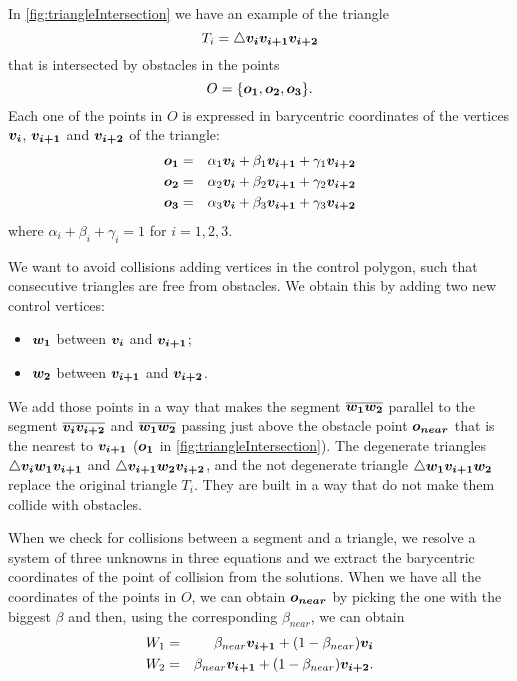 \documentclass[dissertation.tex]{subfiles}
\begin{document}
In \cref{fig:triangleIntersection} we have an example of the triangle
\begin{equation*}
  T_i = \triangle \boldsymbol{v_i}\boldsymbol{v_{i+1}}\boldsymbol{v_{i+2}} 
\end{equation*}
that is
intersected by obstacles in the points
\begin{equation*}
  O = \{\boldsymbol{o_1},\boldsymbol{o_2},\boldsymbol{o_3}\}.
\end{equation*}
Each one of the points in $O$ is expressed in barycentric
coordinates of the vertices $\boldsymbol{v_i}$, $\boldsymbol{v_{i+1}}$ and $\boldsymbol{v_{i+2}}$ of the
triangle:
\begin{eqnarray*}
  \boldsymbol{o_1}&=&\alpha_1 \boldsymbol{v_i}+\beta_1 \boldsymbol{v_{i+1}}+\gamma_1 \boldsymbol{v_{i+2}}\\
  \boldsymbol{o_2}&=&\alpha_2 \boldsymbol{v_i}+\beta_2 \boldsymbol{v_{i+1}}+\gamma_2 \boldsymbol{v_{i+2}}\\
  \boldsymbol{o_3}&=&\alpha_3 \boldsymbol{v_i}+\beta_3 \boldsymbol{v_{i+1}}+\gamma_3 \boldsymbol{v_{i+2}}
\end{eqnarray*}
where $\alpha_i+\beta_i+\gamma_i=1$ for $i=1,2,3$.

We want to avoid collisions adding vertices in the control
polygon, such that consecutive triangles are free from obstacles. We
obtain this by adding two new control vertices: 
\begin{itemize}
\item $\boldsymbol{w_1}$ between $\boldsymbol{v_i}$ and $\boldsymbol{v_{i+1}}$;
\item $\boldsymbol{w_2}$ between $\boldsymbol{v_{i+1}}$ and $\boldsymbol{v_{i+2}}$.
\end{itemize}
We add those
points in a way that makes the segment $\overline{\boldsymbol{w_1}\boldsymbol{w_2}}$
parallel to the segment $\overline{\boldsymbol{v_i}\boldsymbol{v_{i+2}}}$ and 
$\overline{\boldsymbol{w_1}\boldsymbol{w_2}}$ passing just above the obstacle point
$\boldsymbol{o_{near}}$ that is the nearest
to $\boldsymbol{v_{i+1}}$ ($\boldsymbol{o_1}$ in
\cref{fig:triangleIntersection}). The degenerate triangles $\triangle \boldsymbol{v_i}\boldsymbol{w_1}\boldsymbol{v_{i+1}}$ and $\triangle
\boldsymbol{v_{i+1}}\boldsymbol{w_2}\boldsymbol{v_{i+2}}$, and the not degenerate triangle
$\triangle \boldsymbol{w_1}\boldsymbol{v_{i+1}}\boldsymbol{w_2}$ replace the original triangle
$T_i$. They are built in a way that do not make them collide with obstacles.

When we check for collisions between a segment and a triangle, we
resolve a system of three unknowns in
three equations and we extract the barycentric
coordinates of
the point of collision from the solutions. When we have all the
coordinates of the points 
in $O$, we can obtain $\boldsymbol{o_{near}}$ by picking the one with the biggest $\beta$
and then, using the corresponding $\beta_{near}$, we can obtain
\begin{eqnarray*}
  W_1&=&\beta_{near} \boldsymbol{v_{i+1}}+(1-\beta_{near})\boldsymbol{v_i}\\
  W_2&=&\beta_{near} \boldsymbol{v_{i+1}}+(1-\beta_{near})\boldsymbol{v_{i+2}}.
\end{eqnarray*}
\end{document}
